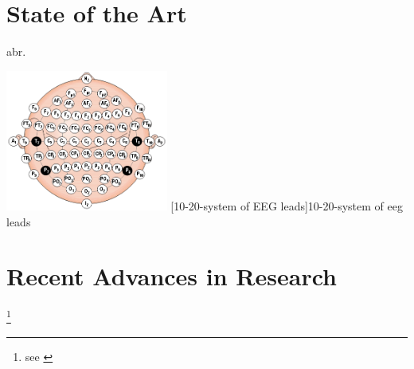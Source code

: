 

\section{State of the Art}

\blindtext \blindtext \gls{abr}.

\begin{center}
	\includegraphics[width=0.4\textwidth]{images/eeg_leads}
	[10-20-system of EEG leads]{10-20-system of \gls{eeg} leads\footnotemark}
	\label{fig_eeg_leads}
\end{center}

\newpage

\section{Recent Advances in Research}

\blindtext \blindtext \footnote{see \cite{SS02, DSP02}}

\blindtext \blindtext
